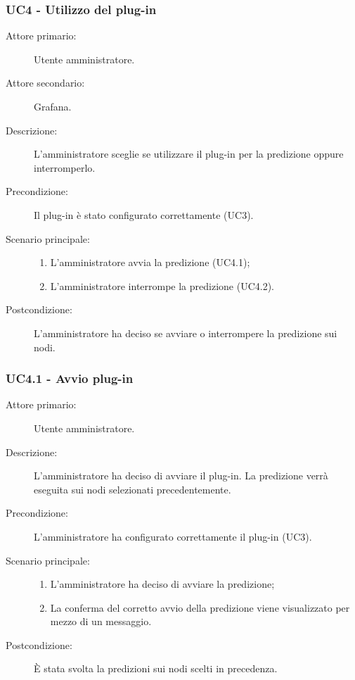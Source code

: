 \subsubsection{UC4 - Utilizzo del plug-in}
\label{sssec:uc4}
\begin{description}
  \item[Attore primario:] Utente amministratore.
  \item[Attore secondario:] Grafana.
  \item[Descrizione:] L'amministratore sceglie se utilizzare il plug-in per la predizione oppure interromperlo.
  \item[Precondizione:] Il plug-in è stato configurato correttamente (UC3).
  \item[Scenario principale:]
  \begin{enumerate}
    \item L'amministratore avvia la predizione (UC4.1);
    \item L'amministratore interrompe la predizione (UC4.2).
  \end{enumerate}
  \item[Postcondizione:] L'amministratore ha deciso se avviare o interrompere la predizione sui nodi.
\end{description}

\subsubsection{UC4.1 - Avvio plug-in}
\label{sssec:uc4.1}
\begin{description}
  \item[Attore primario:] Utente amministratore.
  \item[Descrizione:] L'amministratore ha deciso di avviare il plug-in. La predizione verrà eseguita sui nodi selezionati precedentemente.
  \item[Precondizione:] L'amministratore ha configurato correttamente il plug-in (UC3).
  \item[Scenario principale:]
  \begin{enumerate}
    \item L'amministratore ha deciso di avviare la predizione;
    \item La conferma del corretto avvio della predizione viene visualizzato per mezzo di un messaggio.
  \end{enumerate}
  \item[Postcondizione:] È stata svolta la predizioni sui nodi scelti in precedenza.
\end{description}

